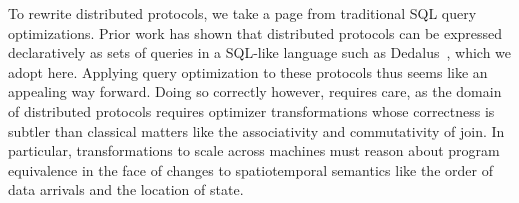 To rewrite distributed protocols, we take a page from traditional SQL query optimizations.
Prior work has shown that distributed protocols
can be expressed declaratively as sets of queries in a SQL-like language such as Dedalus~\cite{dedalus}, which we adopt here. 
Applying query optimization to these protocols thus seems like an appealing way forward. Doing so correctly however, requires care, as the domain of distributed protocols requires optimizer transformations whose correctness is subtler than classical matters like the associativity and commutativity of join.
In particular, transformations to scale across machines must reason about program equivalence in the face of changes to spatiotemporal semantics like the order of data arrivals and the location of state.

